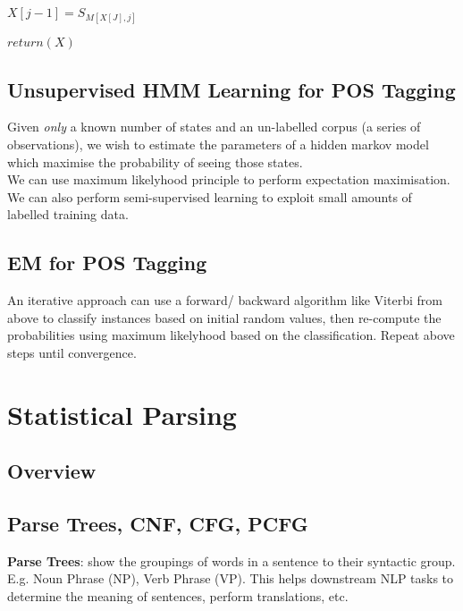 \documentclass[]{article}
\begin{document}
\begin{algorithm}
\begin{algorithmic}[1]
                \State $X[j-1] = S_{M[X[J], j]}$
            
            \EndFor
            
            \State $return(X)$
            
            \EndProcedure
            
		\end{algorithmic}
	\end{algorithm}
	
	\subsection{Unsupervised HMM Learning for POS Tagging} 
	Given \textit{only} a known number of states and an un-labelled corpus (a series of observations), we wish to estimate the parameters of a hidden markov model which maximise the probability of seeing those states. 
	\\
	We can use maximum likelyhood principle to perform expectation maximisation.
	\\
	We can also perform semi-supervised learning to exploit small amounts of labelled training data.
	
	\subsection{EM for POS Tagging}
	
	An iterative approach can use a forward/ backward algorithm like Viterbi from above to classify instances based on initial random values, then re-compute the probabilities using maximum likelyhood based on the classification. Repeat above steps until convergence.
	
	\clearpage
	\section{Statistical Parsing}
	
	\subsection{Overview}
	
	\subsection{Parse Trees, CNF, CFG, PCFG}
	
	\textbf{Parse Trees}: show the groupings of words in a sentence to their syntactic group. E.g. Noun Phrase (NP), Verb Phrase (VP). This helps downstream NLP tasks to determine the meaning of sentences, perform translations, etc. \\
	
\end{document}
